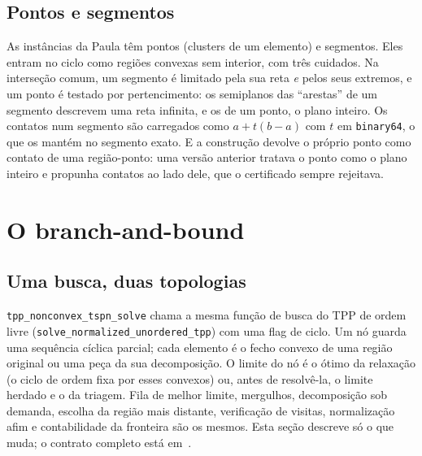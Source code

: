 \documentclass[11pt,a4paper]{article}
\theoremstyle{plain}\newtheorem{proposicao}{Proposição}
\theoremstyle{definition}\newtheorem{definicao}{Definição}
\theoremstyle{plain}\newtheorem{teorema}{Teorema}
\theoremstyle{plain}\newtheorem{lema}{Lema}
\newcommand{\code}[1]{\texttt{\small #1}}
\begin{document}
\subsection{Pontos e segmentos}
As instâncias da Paula têm pontos (clusters de um elemento) e segmentos. Eles entram no ciclo como regiões convexas sem interior, com três cuidados. Na interseção comum, um segmento é limitado pela sua reta \emph{e} pelos seus extremos, e um ponto é testado por pertencimento: os semiplanos das ``arestas'' de um segmento descrevem uma reta infinita, e os de um ponto, o plano inteiro. Os contatos num segmento são carregados como \(a+t(b-a)\) com \(t\) em \texttt{binary64}, o que os mantém no segmento exato. E a construção devolve o próprio ponto como contato de uma região-ponto: uma versão anterior tratava o ponto como o plano inteiro e propunha contatos ao lado dele, que o certificado sempre rejeitava.

\section{O branch-and-bound}\label{sec:bnb}

\subsection{Uma busca, duas topologias}
\code{tpp\_nonconvex\_tspn\_solve} chama a mesma função de busca do TPP de ordem livre (\code{solve\_normalized\_unordered\_tpp}) com uma flag de ciclo. Um nó guarda uma sequência cíclica parcial; cada elemento é o fecho convexo de uma região original ou uma peça da sua decomposição. O limite do nó é o ótimo da relaxação (o ciclo de ordem fixa por esses convexos) ou, antes de resolvê-la, o limite herdado e o da triagem. Fila de melhor limite, mergulhos, decomposição sob demanda, escolha da região mais distante, verificação de visitas, normalização afim e contabilidade da fronteira são os mesmos. Esta seção descreve só o que muda; o contrato completo está em~\cite{tspnmd}.
\end{document}
